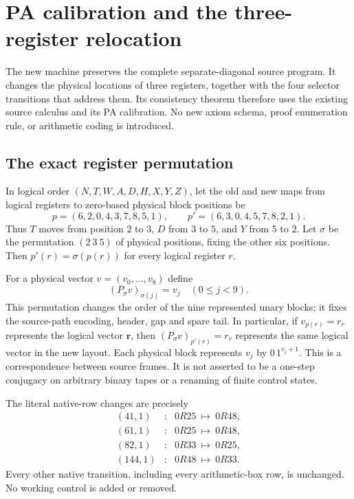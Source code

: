 \section{PA calibration and the three-register relocation}
\label{sec:layout-calibration}

The new machine preserves the complete separate-diagonal source program.
It changes the physical locations of three registers, together with the
four selector transitions that address them.  Its consistency theorem
therefore uses the existing source calculus and its PA calibration.  No
new axiom schema, proof enumeration rule, or arithmetic coding is introduced.

\subsection{The exact register permutation}

In logical order $(N,T,W,A,D,H,X,Y,Z)$, let the old and new maps from
logical registers to zero-based physical block positions be
\[
 p=(6,2,0,4,3,7,8,5,1),\qquad
 p'=(6,3,0,4,5,7,8,2,1).
\]
Thus $T$ moves from position $2$ to $3$, $D$ from $3$ to $5$, and $Y$
from $5$ to $2$.  Let $\sigma$ be the permutation $(2\ 3\ 5)$ of
physical positions, fixing the other six positions.  Then
$p'(r)=\sigma(p(r))$ for every logical register $r$.

For a physical vector $v=(v_0,\ldots,v_8)$ define
\[
 (P_\sigma v)_{\sigma(j)}=v_j\quad(0\le j<9).
\]
This permutation changes the order of the nine represented unary blocks;
it fixes the source-path encoding, header, gap and spare tail.  In particular,
if $v_{p(r)}=r_r$ represents the logical vector $\mathbf r$, then
$(P_\sigma v)_{p'(r)}=r_r$ represents the same logical vector in the new
layout.  Each physical block represents $v_j$ by $0\,1^{v_j+1}$.
This is a correspondence between source frames.  It is not asserted to
be a one-step conjugacy on arbitrary binary tapes or a renaming of finite
control states.

The literal native-row changes are precisely
\[
\begin{array}{rcl}
 (41,1)&:&0R25\ \longmapsto\ 0R48,\\
 (61,1)&:&0R25\ \longmapsto\ 0R48,\\
 (82,1)&:&0R33\ \longmapsto\ 0R25,\\
 (144,1)&:&0R48\ \longmapsto\ 0R33.
\end{array}
\]
Every other native transition, including every arithmetic-box row,
is unchanged.  No working control is added or removed.

